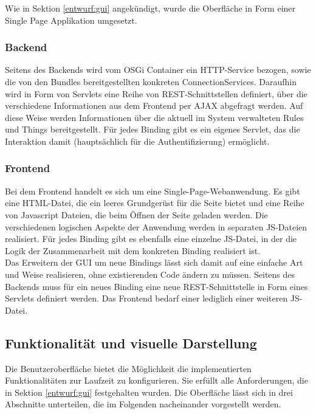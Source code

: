 Wie in Sektion \ref{entwurf:gui} angekündigt, wurde die Oberfläche in Form einer Single Page Applikation umgesetzt. 

\subsubsection{Backend}
Seitens des Backends wird vom OSGi Container ein HTTP-Service bezogen, sowie die von den Bundles bereitgestellten konkreten ConnectionServices. Daraufhin wird in Form von Servlets eine Reihe von REST-Schnittstellen definiert, über die verschiedene Informationen aus dem Frontend per AJAX abgefragt werden. 
Auf diese Weise werden Informationen über die aktuell im System verwalteten Rules und Things bereitgestellt. Für jedes Binding gibt es ein eigenes Servlet, das die Interaktion damit (hauptsächlich für die Authentifizierung) ermöglicht. 



\subsubsection{Frontend}
Bei dem Frontend handelt es sich um eine Single-Page-Webanwendung. Es gibt eine HTML-Datei, die ein leeres Grundgerüst für die Seite bietet und eine Reihe von Javascript Dateien, die beim Öffnen der Seite geladen werden. Die verschiedenen logischen Aspekte der  Anwendung werden in separaten JS-Dateien realisiert. Für jedes Binding gibt es ebenfalls eine einzelne JS-Datei, in der die Logik der Zusammenarbeit mit dem konkreten Binding realisiert ist. \\

Das Erweitern der GUI um neue Bindings lässt sich damit auf eine einfache Art und Weise realisieren, ohne existierenden Code ändern zu müssen. Seitens des Backends muss für ein neues Binding eine neue REST-Schnittstelle in Form eines Servlets definiert werden. Das Frontend bedarf	einer lediglich einer weiteren JS-Datei.		\\


\subsection{Funktionalität und visuelle Darstellung}
Die Benutzeroberfläche bietet die Möglichkeit die implementierten Funktionalitäten zur Laufzeit zu konfigurieren. Sie erfüllt alle Anforderungen, die in Sektion \ref{entwurf:gui} festgehalten wurden. Die Oberfläche lässt sich in drei Abschnitte unterteilen, die im Folgenden nacheinander vorgestellt werden.


